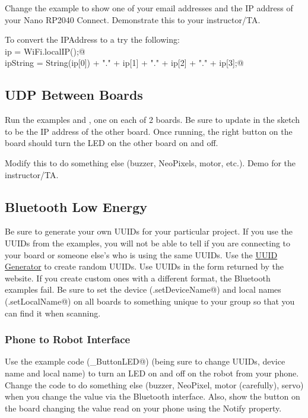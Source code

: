 Change the example to show one of your email addresses and the IP address of your 
Nano RP2040 Connect. Demonstrate this to your instructor/TA.

To convert the IPAddress to a \lstinline@String@ try the following:\\
\lstinline@IPAddress ip = WiFi.localIP();@\\
\lstinline@String ipString = String(ip[0]) + "." + ip[1] + "." + ip[2] + "." + ip[3];@

\subsection{UDP Between Boards}
Run the examples \lstinline@WiFiUdpSend@ and \lstinline@WiFiUdpReceiveSend@, one 
on each of 2 boards. Be sure to update \lstinline@remoteIp@ in the 
\lstinline@WiFiUdpSend@ sketch to be the IP address of the other board. Once 
running, the right button on the \lstinline@@ board should turn the LED on 
the other board on and off.

Modify this to do something else (buzzer, NeoPixels, motor, etc.). Demo for the 
instructor/TA.

\subsection{Bluetooth Low Energy}
Be sure to generate your own UUIDs for your particular project. If you use
the UUIDs from the examples, you will not be able to tell if you are connecting
to your board or someone else's who is using the same UUIDs. Use the 
\href{https://www.uuidgenerator.net/}{UUID Generator} to create random UUIDs.
Use UUIDs in the form returned by the website. If you create custom ones with 
a different format, the Bluetooth examples fail.
Be sure to set the device (\lstinline@BLE.setDeviceName@) and local names 
(\lstinline@BLE.setLocalName@) on all boards to something unique to 
your group so that you can find it when scanning.

\subsubsection{Phone to Robot Interface}
Use the example code (\lstinline@BLE_ButtonLED@) (being sure to change UUIDs, device name and local name)
to turn an LED on and off on the robot from your phone. Change the code to 
do something else (buzzer, NeoPixel, motor (carefully), servo) when you change 
the value via the Bluetooth interface. Also, show the button on the board changing
the value read on your phone using the Notify property.

